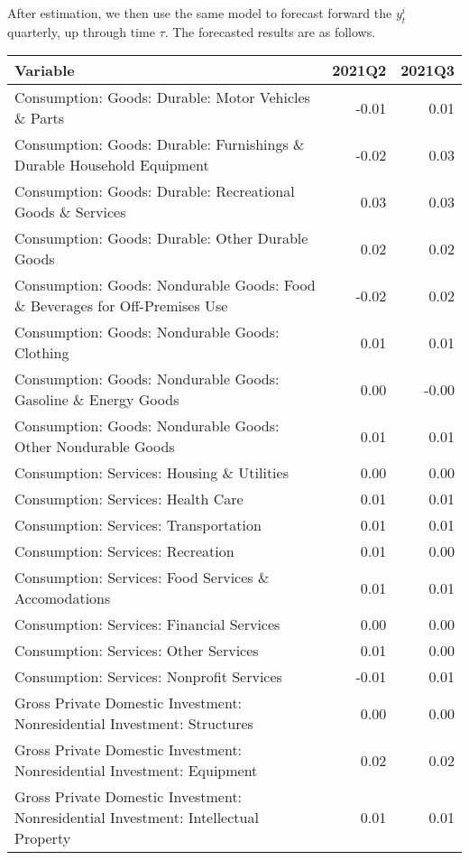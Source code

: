 \documentclass[11pt, letterpaper]{article}\usepackage[]{graphicx}\usepackage[]{color}
\begin{document}
After estimation, we then use the same model to forecast forward the $y^i_t$ quarterly, up through time $\tau$. 
The forecasted results are as follows.
\begin{table}[H]
\centering
\begingroup\scriptsize
\begin{tabular}{lrr}
  \hline
Variable & 2021Q2 & 2021Q3 \\ 
  \hline
Consumption: Goods: Durable: Motor Vehicles \& Parts & -0.01 & 0.01 \\ 
  Consumption: Goods: Durable: Furnishings \& Durable Household Equipment & -0.02 & 0.03 \\ 
  Consumption: Goods: Durable: Recreational Goods \& Services & 0.03 & 0.03 \\ 
  Consumption: Goods: Durable: Other Durable Goods & 0.02 & 0.02 \\ 
  Consumption: Goods: Nondurable Goods: Food \& Beverages for Off-Premises Use & -0.02 & 0.02 \\ 
  Consumption: Goods: Nondurable Goods: Clothing & 0.01 & 0.01 \\ 
  Consumption: Goods: Nondurable Goods: Gasoline \& Energy Goods & 0.00 & -0.00 \\ 
  Consumption: Goods: Nondurable Goods: Other Nondurable Goods & 0.01 & 0.01 \\ 
  Consumption: Services: Housing \& Utilities & 0.00 & 0.00 \\ 
  Consumption: Services: Health Care & 0.01 & 0.01 \\ 
  Consumption: Services: Transportation & 0.01 & 0.01 \\ 
  Consumption: Services: Recreation & 0.01 & 0.00 \\ 
  Consumption: Services: Food Services \& Accomodations & 0.01 & 0.01 \\ 
  Consumption: Services: Financial Services & 0.00 & 0.00 \\ 
  Consumption: Services: Other Services & 0.01 & 0.00 \\ 
  Consumption: Services: Nonprofit Services & -0.01 & 0.01 \\ 
  Gross Private Domestic Investment: Nonresidential Investment: Structures & 0.00 & 0.00 \\ 
  Gross Private Domestic Investment: Nonresidential Investment: Equipment & 0.02 & 0.02 \\ 
  Gross Private Domestic Investment: Nonresidential Investment: Intellectual Property & 0.01 & 0.01 \\ 

\end{tabular}
\end{table}
\end{document}
